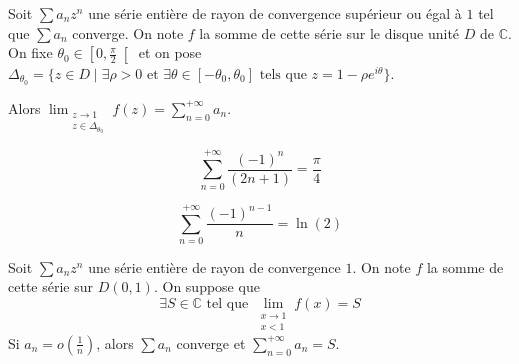 	\begin{theorem}
		\label{243-1}
		Soit $\sum a_n z^n$ une série entière de rayon de convergence supérieur ou égal à $1$ tel que $\sum a_n$ converge. On note $f$ la somme de cette série sur le disque unité $D$ de $\mathbb{C}$. On fixe $\theta_0 \in \left[ 0, \frac{\pi}{2} \right[$ et on pose $\Delta_{\theta_0} = \{ z \in D \mid \exists \rho > 0 \text{ et } \exists \theta \in [-\theta_0, \theta_0] \text{ tels que } z = 1 - \rho e^{i\theta} \}$.
		\begin{center}
		\end{center}
		Alors $\lim_{\substack{z \rightarrow 1 \\ z \in \Delta_{\theta_0}}} f(z) = \sum_{n=0}^{+\infty} a_n$.
	\end{theorem}

	\begin{application}
		\[ \sum_{n=0}^{+\infty} \frac{(-1)^n}{(2n+1)} = \frac{\pi}{4} \]
	\end{application}

	\begin{application}
		\[ \sum_{n=0}^{+\infty} \frac{(-1)^{n-1}}{n} = \ln(2) \]
	\end{application}

	\begin{theorem}
		Soit $\sum a_n z^n$ une série entière de rayon de convergence $1$. On note $f$ la somme de cette série sur $D(0,1)$. On suppose que
		\[ \exists S \in \mathbb{C} \text{ tel que } \lim_{\substack{x \rightarrow 1 \\ x < 1}} f(x) = S \]
		Si $a_n = o \left( \frac{1}{n} \right)$, alors $\sum a_n$ converge et $\sum_{n=0}^{+\infty} a_n = S$.
	\end{theorem}

